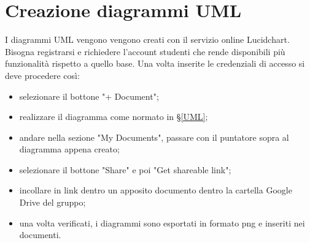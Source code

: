 \section{Creazione diagrammi UML}
I diagrammi UML vengono vengono creati con il servizio online Lucidchart. Bisogna registrarsi e richiedere l'account studenti che rende disponibili più funzionalità rispetto a quello base. Una volta inserite le credenziali di accesso si deve procedere così:
\begin{itemize}
	\item selezionare il bottone "+ Document";
	\item realizzare il diagramma come normato in §\ref{UML};
	\item andare nella sezione "My Documents", passare con il puntatore sopra al diagramma appena creato;
	\item selezionare il bottone "Share" e poi "Get shareable link";
	\item incollare in link dentro un apposito documento dentro la cartella Google Drive del gruppo;
	\item una volta verificati, i diagrammi sono esportati in formato png e inseriti nei documenti.
\end{itemize}
